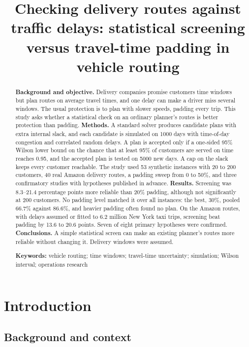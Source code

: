 \documentclass[12pt,letterpaper]{article}
\title{Checking delivery routes against traffic delays: statistical screening
versus travel-time padding in vehicle routing}
\date{}
\begin{document}
\maketitle

\begin{abstract}
\noindent\textbf{Background and objective.} Delivery companies promise customers
time windows but plan routes on average travel times, and one delay can make a
driver miss several windows. The usual protection is to
plan with slower speeds, padding every trip. This study asks whether a statistical
check on an ordinary planner's routes is better protection than padding. \textbf{Methods.} A standard solver produces candidate
plans with extra internal slack, and each candidate is simulated on 1000
days with time-of-day congestion and correlated random delays. A plan is accepted
only if a one-sided 95\% Wilson lower bound on the chance that at least 95\% of
customers are served on time reaches 0.95, and the accepted plan is tested
on 5000 new days. A cap on the slack keeps every customer reachable. The study
used 53 synthetic instances with 20 to 200 customers, 40 real Amazon
delivery routes, a padding sweep from 0 to 50\%, and three confirmatory studies
with hypotheses published in advance. \textbf{Results.} Screening was 8.3--21.4 percentage points more
reliable than 20\% padding, although not significantly at 200 customers. No padding
level matched it over all instances: the best, 30\%, pooled 66.7\%
against 86.6\%, and heavier padding often found no plan. On the Amazon routes, with delays assumed or
fitted to 6.2 million New York taxi trips, screening beat padding by
13.6 to 20.6 points. Seven of
eight primary hypotheses were confirmed. \textbf{Conclusions.} A
simple statistical screen can make an existing planner's routes more reliable without changing it. Delivery windows were assumed.

\medskip\noindent\textbf{Keywords:} vehicle routing; time windows; travel-time
uncertainty; simulation; Wilson interval; operations research
\end{abstract}

\section{Introduction}

\subsection{Background and context}
\end{document}
